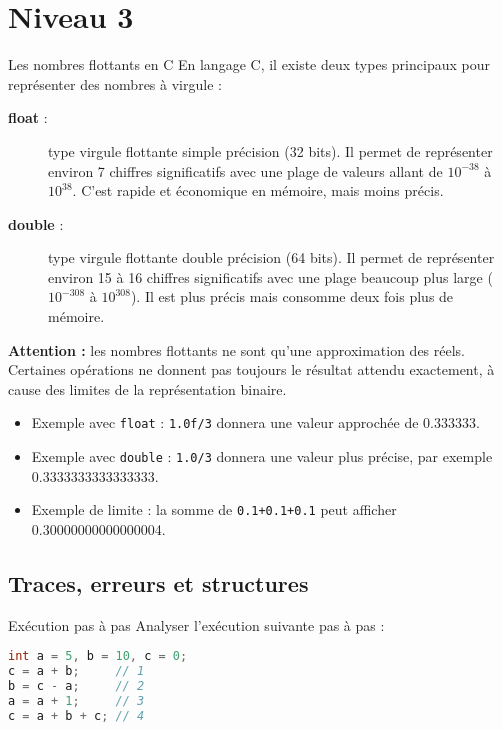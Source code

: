 \section{Niveau 3}

\begin{UPSTIinfor}{Les nombres flottants en C}
En langage C, il existe deux types principaux pour représenter des nombres à virgule :
\begin{description}
    \item[\textbf{float} :] type virgule flottante simple précision (32 bits).  
    Il permet de représenter environ 7 chiffres significatifs avec une plage de valeurs allant de \(10^{-38}\) à \(10^{38}\).  
    C’est rapide et économique en mémoire, mais moins précis.

    \item[\textbf{double} :] type virgule flottante double précision (64 bits).  
    Il permet de représenter environ 15 à 16 chiffres significatifs avec une plage beaucoup plus large (\(10^{-308}\) à \(10^{308}\)).  
    Il est plus précis mais consomme deux fois plus de mémoire.
\end{description}
\textbf{Attention :} les nombres flottants ne sont qu’une approximation des réels. Certaines opérations ne donnent pas toujours le résultat attendu exactement, à cause des limites de la représentation binaire.
\begin{itemize}
    \item Exemple avec \texttt{float} : \verb|1.0f/3| donnera une valeur approchée de 0.333333.  
    \item Exemple avec \texttt{double} : \verb|1.0/3| donnera une valeur plus précise, par exemple 0.3333333333333333.  
    \item Exemple de limite : la somme de \verb|0.1+0.1+0.1| peut afficher 0.30000000000000004.
\end{itemize}
\end{UPSTIinfor}

\subsection{Traces, erreurs et structures}


\begin{UPSTIexercice}{Exécution pas à pas}
Analyser l'exécution suivante pas à pas :
\begin{lstlisting}[language=C]
int a = 5, b = 10, c = 0;
c = a + b;     // 1
b = c - a;     // 2
a = a + 1;     // 3
c = a + b + c; // 4
\end{lstlisting}
\end{UPSTIexercice}


